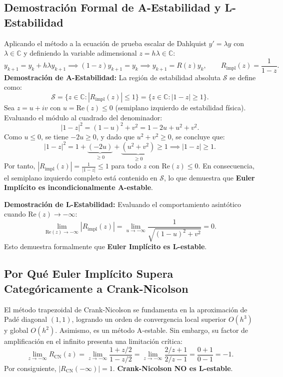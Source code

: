 \documentclass[11pt,a4paper]{article}
\begin{document}
\subsection{Demostración Formal de A-Estabilidad y L-Estabilidad}
Aplicando el método a la ecuación de prueba escalar de Dahlquist $y' = \lambda y$ con $\lambda \in \mathbb{C}$ y definiendo la variable adimensional $z = h\lambda \in \mathbb{C}$:
\begin{equation}
    y_{k+1} = y_k + h\lambda y_{k+1} \implies (1 - z)y_{k+1} = y_k \implies y_{k+1} = R(z)y_k, \qquad R_{\text{impl}}(z) = \frac{1}{1 - z}.
\end{equation}
\textbf{Demostración de A-Estabilidad:}
La región de estabilidad absoluta $\mathcal{S}$ se define como:
\begin{equation}
    \mathcal{S} = \{ z \in \mathbb{C} : |R_{\text{impl}}(z)| \le 1 \} = \{ z \in \mathbb{C} : |1 - z| \ge 1 \}.
\end{equation}
Sea $z = u + iv$ con $u = \text{Re}(z) \le 0$ (semiplano izquierdo de estabilidad física). Evaluando el módulo al cuadrado del denominador:
\begin{equation}
    |1 - z|^2 = (1 - u)^2 + v^2 = 1 - 2u + u^2 + v^2.
\end{equation}
Como $u \le 0$, se tiene $-2u \ge 0$, y dado que $u^2 + v^2 \ge 0$, se concluye que:
\begin{equation}
    |1 - z|^2 = 1 + \underbrace{(-2u)}_{\ge 0} + \underbrace{(u^2 + v^2)}_{\ge 0} \ge 1 \implies |1 - z| \ge 1.
\end{equation}
Por tanto, $|R_{\text{impl}}(z)| = \frac{1}{|1 - z|} \le 1$ para todo $z$ con $\text{Re}(z) \le 0$. En consecuencia, el semiplano izquierdo completo está contenido en $\mathcal{S}$, lo que demuestra que \textbf{Euler Implícito es incondicionalmente A-estable}.

\textbf{Demostración de L-Estabilidad:}
Evaluando el comportamiento asintótico cuando $\text{Re}(z) \to -\infty$:
\begin{equation}
    \lim_{\text{Re}(z) \to -\infty} |R_{\text{impl}}(z)| = \lim_{u \to -\infty} \frac{1}{\sqrt{(1 - u)^2 + v^2}} = 0.
\end{equation}
Esto demuestra formalmente que \textbf{Euler Implícito es L-estable}.

\subsection{Por Qué Euler Implícito Supera Categóricamente a Crank-Nicolson}
El método trapezoidal de Crank-Nicolson se fundamenta en la aproximación de Padé diagonal $(1, 1)$, logrando un orden de convergencia local superior $O(h^3)$ y global $O(h^2)$. Asimismo, es un método A-estable. Sin embargo, su factor de amplificación en el infinito presenta una limitación crítica:
\begin{equation}
    \lim_{z \to -\infty} R_{\text{CN}}(z) = \lim_{z \to -\infty} \frac{1 + z/2}{1 - z/2} = \lim_{z \to -\infty} \frac{2/z + 1}{2/z - 1} = \frac{0 + 1}{0 - 1} = -1.
\end{equation}
Por consiguiente, $|R_{\text{CN}}(-\infty)| = 1$. \textbf{Crank-Nicolson NO es L-estable}.
\end{document}
